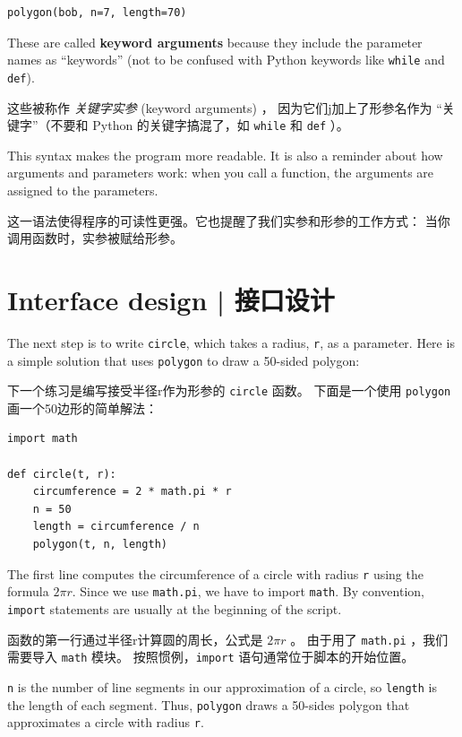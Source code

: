\begin{lstlisting}
polygon(bob, n=7, length=70)
\end{lstlisting}

%
These are called {\bf keyword arguments} because they include
the parameter names as ``keywords'' (not to be confused with
Python keywords like {\tt while} and {\tt def}).

这些被称作 \emph{关键字实参} (keyword arguments) ，
因为它们j加上了形参名作为 ``关键字''（不要和 Python 的关键字搞混了，如 \lstinline{while} 和 \lstinline{def} ）。
  

This syntax makes the program more readable.  It is also a reminder
about how arguments and parameters work: when you call a function, the
arguments are assigned to the parameters.

这一语法使得程序的可读性更强。它也提醒了我们实参和形参的工作方式：
当你调用函数时，实参被赋给形参。

\section{Interface design  |  接口设计}

The next step is to write {\tt circle}, which takes a radius,
{\tt r}, as a parameter.  Here is a simple solution that uses
{\tt polygon} to draw a 50-sided polygon:

下一个练习是编写接受半径r作为形参的 \lstinline{circle} 函数。
下面是一个使用 \lstinline{polygon} 画一个50边形的简单解法：

\begin{lstlisting}
import math

def circle(t, r):
    circumference = 2 * math.pi * r
    n = 50
    length = circumference / n
    polygon(t, n, length)
\end{lstlisting}

%
The first line computes the circumference of a circle with radius
{\tt r} using the formula $2 \pi r$.  Since we use {\tt math.pi}, we
have to import {\tt math}.  By convention, {\tt import} statements
are usually at the beginning of the script.

函数的第一行通过半径r计算圆的周长，公式是 $2 \pi r$ 。
由于用了 \lstinline{math.pi} ，我们需要导入 \lstinline{math} 模块。
按照惯例，\lstinline{import} 语句通常位于脚本的开始位置。

{\tt n} is the number of line segments in our approximation of a circle,
so {\tt length} is the length of each segment.  Thus, {\tt polygon}
draws a 50-sides polygon that approximates a circle with radius {\tt r}.

